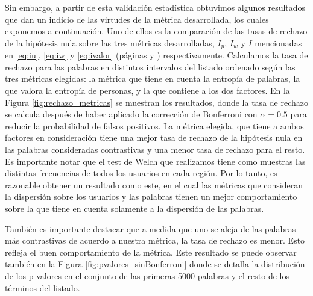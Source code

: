 Sin embargo, a partir de esta validación estadística obtuvimos algunos resultados que dan un indicio de las virtudes de la métrica desarrollada, los cuales exponemos a continuación. Uno de ellos es la comparación de las tasas de rechazo de la hipótesis nula sobre las tres métricas desarrolladas, $I_p$, $I_w$ y $I$ mencionadas en \ref{eq:iu}, \ref{eq:iw} y \ref{eq:ivalor} (páginas \pageref{eq:iw} y \pageref{eq:ivalor}) respectivamente.
Calculamos la tasa de rechazo para las palabras en distintos intervalos del listado ordenado según las tres métricas elegidas: la métrica que tiene en cuenta la entropía de palabras, la que valora la entropía de personas, y la que contiene a los dos factores. En la Figura \ref{fig:rechazo_metricas} se muestran los resultados, donde la tasa de rechazo se calcula después de haber aplicado la corrección de Bonferroni con $\alpha = 0.5$ para reducir la probabilidad de falsos positivos. La métrica elegida, que tiene a ambos factores en consideración tiene una mejor tasa de rechazo de la hipótesis nula en las palabras consideradas contrastivas y una menor tasa de rechazo para el resto. Es importante notar que el test de Welch que realizamos tiene como muestras las distintas frecuencias de todos los usuarios en cada región. Por lo tanto, es razonable obtener un resultado como este, en el cual las métricas que consideran la dispersión sobre los usuarios y las palabras tienen un mejor comportamiento sobre la que tiene en cuenta solamente a la dispersión de las palabras.

También es importante destacar que a medida que uno se aleja de las palabras más contrastivas de acuerdo a nuestra métrica, la tasa de rechazo es menor. Esto refleja el buen comportamiento de la métrica. Este resultado se puede observar también en la Figura \ref{fig:pvalores_sinBonferroni} donde se detalla la distribución de los p-valores en el conjunto de las primeras 5000 palabras y el resto de los términos del listado.

